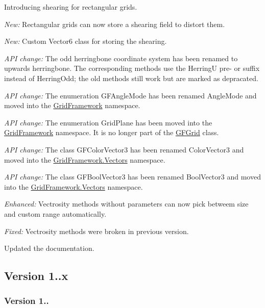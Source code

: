 Introducing shearing for rectangular grids.
\begin{DoxyItemize}
\item {\itshape New\+:} Rectangular grids can now store a {\ttfamily shearing} field to distort them.
\item {\itshape New\+:} Custom {\ttfamily Vector6} class for storing the shearing.
\item {\itshape A\+P\+I change\+:} The odd herringbone coordinate system has been renamed to upwards herringbone. The corresponding methods use the {\ttfamily Herring\+U} pre-\/ or suffix instead of {\ttfamily Herring\+Odd}; the old methods still work but are marked as depracated.
\item {\itshape A\+P\+I change\+:} The enumeration {\ttfamily G\+F\+Angle\+Mode} has been renamed {\ttfamily Angle\+Mode} and moved into the {\ttfamily \hyperlink{namespace_grid_framework}{Grid\+Framework}} namespace.
\item {\itshape A\+P\+I change\+:} The enumeration {\ttfamily Grid\+Plane} has been moved into the {\ttfamily \hyperlink{namespace_grid_framework}{Grid\+Framework}} namespace. It is no longer part of the {\ttfamily \hyperlink{class_g_f_grid}{G\+F\+Grid}} class.
\item {\itshape A\+P\+I change\+:} The class {\ttfamily G\+F\+Color\+Vector3} has been renamed {\ttfamily Color\+Vector3} and moved into the {\ttfamily \hyperlink{namespace_grid_framework_1_1_vectors}{Grid\+Framework.\+Vectors}} namespace.
\item {\itshape A\+P\+I change\+:} The class {\ttfamily G\+F\+Bool\+Vector3} has been renamed {\ttfamily Bool\+Vector3} and moved into the {\ttfamily \hyperlink{namespace_grid_framework_1_1_vectors}{Grid\+Framework.\+Vectors}} namespace.
\item {\itshape Enhanced\+:} Vectrosity methods without parameters can now pick betweem size and custom range automatically.
\item {\itshape Fixed\+:} Vectrosity methods were broken in previous version.
\item Updated the documentation. 


\end{DoxyItemize}

\subsection*{Version 1..\+x }

\subsubsection*{Version 1..}

